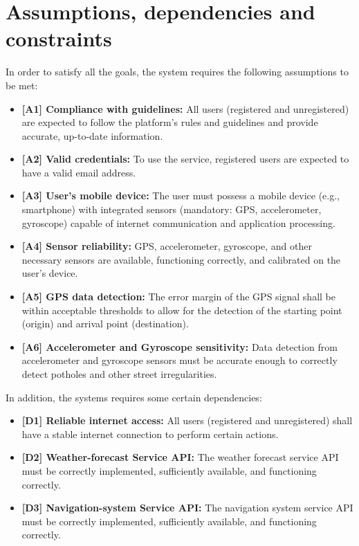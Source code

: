 \documentclass{Configuration_Files/PoliMi3i_thesis}
\begin{document}
\newpage
\section{Assumptions, dependencies and constraints}

In order to satisfy all the goals, the system requires the following assumptions to be met:
\begin{itemize}  
	\item \textbf{[A1] Compliance with guidelines:} All users (registered and unregistered) are expected to follow the platform’s rules and guidelines and provide accurate, up-to-date information.
	\item \textbf{[A2] Valid credentials:} To use the service, registered users are expected to have a valid email address.
	\item \textbf{[A3] User’s mobile device:} The user must possess a mobile device (e.g., smartphone) with integrated sensors (mandatory: GPS, accelerometer, gyroscope) capable of internet communication and application processing.
	\item \textbf{[A4] Sensor reliability:} GPS, accelerometer, gyroscope, and other necessary sensors are available, functioning correctly, and calibrated on the user's device.
	\item \textbf{[A5] GPS data detection:} The error margin of the GPS signal shall be within acceptable thresholds to allow for the detection of the starting point (origin) and arrival point (destination).
	\item \textbf{[A6] Accelerometer and Gyroscope sensitivity:} Data detection from accelerometer and gyroscope sensors must be accurate enough to correctly detect potholes and other street irregularities.
\end{itemize}
In addition, the systems requires some certain dependencies:
\begin{itemize}  
	\item \textbf{[D1] Reliable internet access:} All users (registered and unregistered) shall have a stable internet connection to perform certain actions.
	\item \textbf{[D2] Weather-forecast Service API:} The weather forecast service API must be correctly implemented, sufficiently available, and functioning correctly.
	\item \textbf{[D3] Navigation-system Service API:} The navigation system service API must be correctly implemented, sufficiently available, and functioning correctly.
\end{itemize}
\end{document}
